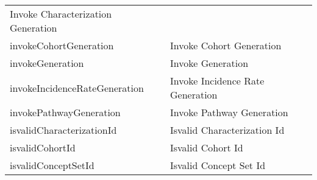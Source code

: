 \documentclass[
]{article}
\begin{document}
\begin{longtable}[]{@{}ll@{}}
\begin{minipage}[t]{0.48\columnwidth}
Invoke Characterization Generation\strut
\end{minipage}\tabularnewline
\begin{minipage}[t]{0.46\columnwidth}\raggedright
invokeCohortGeneration\strut
\end{minipage} & \begin{minipage}[t]{0.48\columnwidth}\raggedright
Invoke Cohort Generation\strut
\end{minipage}\tabularnewline
\begin{minipage}[t]{0.46\columnwidth}\raggedright
invokeGeneration\strut
\end{minipage} & \begin{minipage}[t]{0.48\columnwidth}\raggedright
Invoke Generation\strut
\end{minipage}\tabularnewline
\begin{minipage}[t]{0.46\columnwidth}\raggedright
invokeIncidenceRateGeneration\strut
\end{minipage} & \begin{minipage}[t]{0.48\columnwidth}\raggedright
Invoke Incidence Rate Generation\strut
\end{minipage}\tabularnewline
\begin{minipage}[t]{0.46\columnwidth}\raggedright
invokePathwayGeneration\strut
\end{minipage} & \begin{minipage}[t]{0.48\columnwidth}\raggedright
Invoke Pathway Generation\strut
\end{minipage}\tabularnewline
\begin{minipage}[t]{0.46\columnwidth}\raggedright
isvalidCharacterizationId\strut
\end{minipage} & \begin{minipage}[t]{0.48\columnwidth}\raggedright
Isvalid Characterization Id\strut
\end{minipage}\tabularnewline
\begin{minipage}[t]{0.46\columnwidth}\raggedright
isvalidCohortId\strut
\end{minipage} & \begin{minipage}[t]{0.48\columnwidth}\raggedright
Isvalid Cohort Id\strut
\end{minipage}\tabularnewline
\begin{minipage}[t]{0.46\columnwidth}\raggedright
isvalidConceptSetId\strut
\end{minipage} & \begin{minipage}[t]{0.48\columnwidth}\raggedright
Isvalid Concept Set Id\strut

\end{minipage}
\end{longtable}
\end{document}
